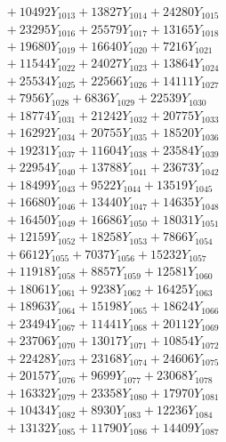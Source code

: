 \documentclass[a4paper,10pt]{article}
\begin{document}
{\begin{align}
&\;  + 10492 Y_{1013} + 13827 Y_{1014} + 24280 Y_{1015} \\[0.3ex]
&\;  + 23295 Y_{1016} + 25579 Y_{1017} + 13165 Y_{1018} \\[0.5ex]\allowbreak
&\;  + 19680 Y_{1019} + 16640 Y_{1020} + 7216 Y_{1021} \\[0.3ex]
&\;  + 11544 Y_{1022} + 24027 Y_{1023} + 13864 Y_{1024} \\[0.3ex]
&\;  + 25534 Y_{1025} + 22566 Y_{1026} + 14111 Y_{1027} \\[0.3ex]
&\;  + 7956 Y_{1028} + 6836 Y_{1029} + 22539 Y_{1030} \\[0.3ex]
&\;  + 18774 Y_{1031} + 21242 Y_{1032} + 20775 Y_{1033} \\[0.3ex]
&\;  + 16292 Y_{1034} + 20755 Y_{1035} + 18520 Y_{1036} \\[0.3ex]
&\;  + 19231 Y_{1037} + 11604 Y_{1038} + 23584 Y_{1039} \\[0.3ex]
&\;  + 22954 Y_{1040} + 13788 Y_{1041} + 23673 Y_{1042} \\[0.3ex]
&\;  + 18499 Y_{1043} + 9522 Y_{1044} + 13519 Y_{1045} \\[0.3ex]
&\;  + 16680 Y_{1046} + 13440 Y_{1047} + 14635 Y_{1048} \\[0.5ex]\allowbreak
&\;  + 16450 Y_{1049} + 16686 Y_{1050} + 18031 Y_{1051} \\[0.3ex]
&\;  + 12159 Y_{1052} + 18258 Y_{1053} + 7866 Y_{1054} \\[0.3ex]
&\;  + 6612 Y_{1055} + 7037 Y_{1056} + 15232 Y_{1057} \\[0.3ex]
&\;  + 11918 Y_{1058} + 8857 Y_{1059} + 12581 Y_{1060} \\[0.3ex]
&\;  + 18061 Y_{1061} + 9238 Y_{1062} + 16425 Y_{1063} \\[0.3ex]
&\;  + 18963 Y_{1064} + 15198 Y_{1065} + 18624 Y_{1066} \\[0.3ex]
&\;  + 23494 Y_{1067} + 11441 Y_{1068} + 20112 Y_{1069} \\[0.3ex]
&\;  + 23706 Y_{1070} + 13017 Y_{1071} + 10854 Y_{1072} \\[0.3ex]
&\;  + 22428 Y_{1073} + 23168 Y_{1074} + 24606 Y_{1075} \\[0.3ex]
&\;  + 20157 Y_{1076} + 9699 Y_{1077} + 23068 Y_{1078} \\[0.5ex]\allowbreak
&\;  + 16332 Y_{1079} + 23358 Y_{1080} + 17970 Y_{1081} \\[0.3ex]
&\;  + 10434 Y_{1082} + 8930 Y_{1083} + 12236 Y_{1084} \\[0.3ex]
&\;  + 13132 Y_{1085} + 11790 Y_{1086} + 14409 Y_{1087} \\[0.3ex]

\end{align}}
\end{document}
